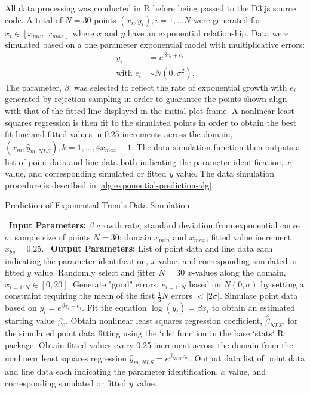 \documentclass[print]{nuthesis}
\begin{document}
All data processing was conducted in R before being passed to the D3.js source code.
A total of \(N = 30\) points \((x_i, y_i), i = 1,...N\) were generated for \(x_i\in [x_{min}, x_{max}]\) where \(x\) and \(y\) have an exponential relationship.
Data were simulated based on a one parameter exponential model with multiplicative errors:
\begin{align}
y_i & = e^{\beta x_i + e_i} \\
\text{with } e_i & \sim N(0, \sigma^2). \nonumber
\end{align}
The parameter, \(\beta\), was selected to reflect the rate of exponential growth with \(e_i\) generated by rejection sampling in order to guarantee the points shown align with that of the fitted line displayed in the initial plot frame.
A nonlinear least squares regression is then fit to the simulated points in order to obtain the best fit line and fitted values in 0.25 increments across the domain, \((x_m, \hat y_{m,NLS}), k = 1, ..., 4 x_{max} +1\).
The data simulation function then outputs a list of point data and line data both indicating the parameter identification, \(x\) value, and corresponding simulated or fitted \(y\) value.
The data simulation procedure is described in \cref{alg:exponential-prediction-alg}.

\begin{algorithm}
  \caption{Prediction of Exponential Trends Data Simulation}\label{alg:exponential-prediction-alg}
  \begin{algorithmic}[1]
    \Statex \textbullet~\textbf{Input Parameters:} $\beta$ growth rate; standard deviation from exponential curve $\sigma$; sample size of points $N = 30$; domain $x_{min}$ and $x_{max}$; fitted value increment $x_{by} = 0.25$.
    \Statex \textbullet~\textbf{Output Parameters:} List of point data and line data each indicating the parameter identification, $x$ value, and corresponding simulated or fitted $y$ value.
    \State Randomly select and jitter $N = 30$ $x$-values along the domain, $x_{i=1:N}\in [0, 20]$.
    \State Generate "good" errors, $e_{i = 1:N}$ based on $N(0,\sigma)$ by setting a constraint requiring the mean of the first $\frac{1}{3} N$ errors $< |2\sigma|.$
    \State Simulate point data based on $y_i = e^{\beta x_i + e_i}$.
    \State Fit the equation $\log(y_i) = \beta x_i$ to obtain an estimated starting value $\beta_0$. 
    \State Obtain nonlinear least squares regression coefficient, $\hat\beta_{NLS}$, for the simulated point data fitting using the `nls` function in the base `stats` R package.
    \State Obtain fitted values every 0.25 increment across the domain from the nonlinear least squares regression $\hat y_{m,NLS} = e^{\hat\beta_{NLS} x_m}$.
    \State Output data list of point data and line data each indicating the parameter identification, $x$ value, and corresponding simulated or fitted $y$ value.
  \end{algorithmic}
\end{algorithm}
\end{document}
